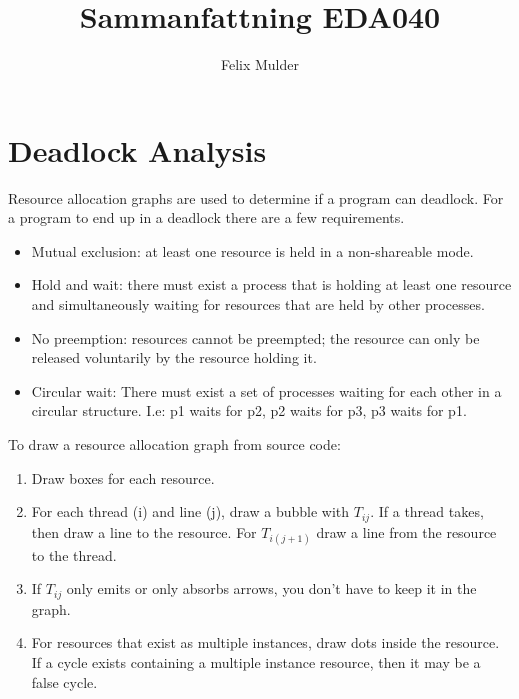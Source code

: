 \documentclass[a4paper]{article}
\title{Sammanfattning EDA040}
\author{Felix Mulder}
\begin{document}
\maketitle
\newpage


\section{Deadlock Analysis}
Resource allocation graphs are used to determine if a program can deadlock.
For a program to end up in a deadlock there are a few requirements.
\begin{itemize}
  \item Mutual exclusion: at least one resource is held in a non-shareable mode.
  \item Hold and wait: there must exist a process that is holding at least one
        resource and simultaneously waiting for resources that are held by other
        processes.
  \item No preemption: resources cannot be preempted; the resource can only be 
        released voluntarily by the resource holding it.
  \item Circular wait: There must exist a set of processes waiting for each other
        in a circular structure. I.e: p1 waits for p2, p2 waits for p3, p3 waits
        for p1.
\end{itemize}

To draw a resource allocation graph from source code:
\begin{enumerate}
  \item Draw boxes for each resource.
  \item For each thread (i) and line (j), draw a bubble with $T_{ij}$. If a thread
        takes, then draw a line to the resource. For $T_{i(j+1)}$ draw a line from the
        resource to the thread.
  \item If $T_{ij}$ only emits or only absorbs arrows, you don't have to keep
        it in the graph.
  \item For resources that exist as multiple instances, draw dots inside the resource.
        If a cycle exists containing a multiple instance resource, then it may be a
        false cycle.
\end{enumerate}
\end{document}

